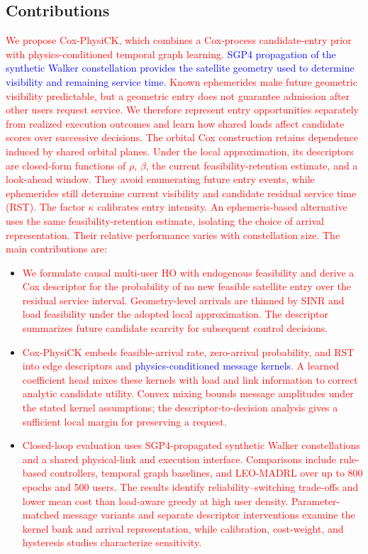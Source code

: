 \documentclass[10pt,letterpaper,journal]{IEEEtran}
\newcommand{\revnew}[1]{\textcolor{red}{#1}}
\begin{document}
\subsection{Contributions}
\revnew{We propose Cox-PhysiCK, which combines a Cox-process candidate-entry prior with physics-conditioned temporal graph learning.}
\textcolor{blue}{SGP4 propagation of the synthetic Walker constellation provides the satellite geometry used to determine visibility and remaining service time.}
\revnew{Known ephemerides make future geometric visibility predictable, but a geometric entry does not guarantee admission after other users request service. We therefore represent entry opportunities separately from realized execution outcomes and learn how shared loads affect candidate scores over successive decisions.}
\revnew{The orbital Cox construction retains dependence induced by shared orbital planes. Under the local approximation, its descriptors are closed-form functions of $\rho$, $\beta$, the current feasibility-retention estimate, and a look-ahead window. They avoid enumerating future entry events, while ephemerides still determine current visibility and candidate residual service time (RST). The factor $\kappa$ calibrates entry intensity. An ephemeris-based alternative uses the same feasibility-retention estimate, isolating the choice of arrival representation. Their relative performance varies with constellation size. The main contributions are:}
\begin{itemize}
    \item \revnew{We formulate causal multi-user HO with endogenous feasibility and derive a Cox descriptor for the probability of no new feasible satellite entry over the residual service interval. Geometry-level arrivals are thinned by SINR and load feasibility under the adopted local approximation. The descriptor summarizes future candidate scarcity for subsequent control decisions.}
    \item \revnew{Cox-PhysiCK embeds feasible-arrival rate, zero-arrival probability, and RST into edge descriptors and }
    \textcolor{blue}{physics-conditioned message kernels}\revnew{. A learned coefficient head mixes these kernels with load and link information to correct analytic candidate utility. Convex mixing bounds message amplitudes under the stated kernel assumptions; the descriptor-to-decision analysis gives a sufficient local margin for preserving a request.}
    \item \revnew{Closed-loop evaluation uses SGP4-propagated synthetic Walker constellations and a shared physical-link and execution interface. Comparisons include rule-based controllers, temporal graph baselines, and LEO-MADRL over up to 800 epochs and 500 users. The results identify reliability--switching trade-offs and lower mean cost than load-aware greedy at high user density. Parameter-matched message variants and separate descriptor interventions examine the kernel bank and arrival representation, while calibration, cost-weight, and hysteresis studies characterize sensitivity.}
\end{itemize}
\end{document}
